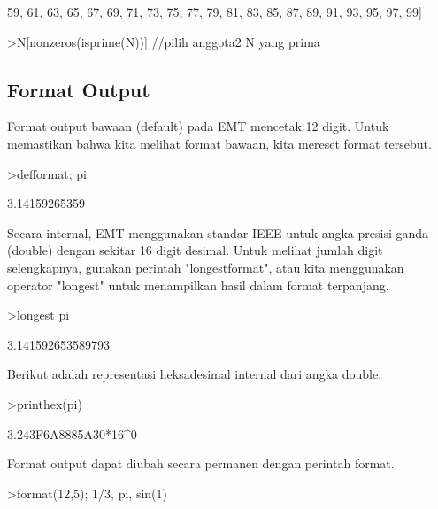 \documentclass{article}
\newenvironment{eulernotebook}{\par}{\par}
\newcommand{\eulersubheading}[1]{\subsection{#1}}
\newenvironment{eulercomment}{\par\medskip}{\par\medskip}
\begin{document}
\begin{eulernotebook}
\begin{euleroutput}
  59,  61,  63,  65,  67,  69,  71,  73,  75,  77,  79,  81,  83,  85,
  87,  89,  91,  93,  95,  97,  99]
\end{euleroutput}
\begin{eulerprompt}
>N[nonzeros(isprime(N))] //pilih anggota2 N yang prima
\end{eulerprompt}
\begin{euleroutput}
  [2,  3,  5,  7,  11,  13,  17,  19,  23,  29,  31,  37,  41,  43,  47,
  53,  59,  61,  67,  71,  73,  79,  83,  89,  97]
\end{euleroutput}
\eulersubheading{Format Output}
\begin{eulercomment}
Format output bawaan (default) pada EMT mencetak 12 digit. Untuk
memastikan bahwa kita melihat format bawaan, kita mereset format
tersebut.
\end{eulercomment}
\begin{eulerprompt}
>defformat; pi
\end{eulerprompt}
\begin{euleroutput}
  3.14159265359
\end{euleroutput}
\begin{eulercomment}
Secara internal, EMT menggunakan standar IEEE untuk angka presisi
ganda (double) dengan sekitar 16 digit desimal. Untuk melihat jumlah
digit selengkapnya, gunakan perintah "longestformat", atau kita
menggunakan operator "longest" untuk menampilkan hasil dalam format
terpanjang.
\end{eulercomment}
\begin{eulerprompt}
>longest pi
\end{eulerprompt}
\begin{euleroutput}
        3.141592653589793 
\end{euleroutput}
\begin{eulercomment}
Berikut adalah representasi heksadesimal internal dari angka double.
\end{eulercomment}
\begin{eulerprompt}
>printhex(pi)
\end{eulerprompt}
\begin{euleroutput}
  3.243F6A8885A30*16^0
\end{euleroutput}
\begin{eulercomment}
Format output dapat diubah secara permanen dengan perintah format.
\end{eulercomment}
\begin{eulerprompt}
>format(12,5); 1/3, pi, sin(1)
\end{eulerprompt}

\end{eulernotebook}
\end{document}

